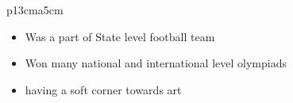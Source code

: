 \documentclass{article}
\begin{document}
{\begin{longtable}{ p{13cm}a{5cm} }
{}\newline

\begin{itemize}[noitemsep,nolistsep]
	\item Was a part of State level football team
	\item Won many national and international level olympiads
	\item having a soft corner towards art\newline
\end{itemize}


\end{longtable} }
\end{document}
